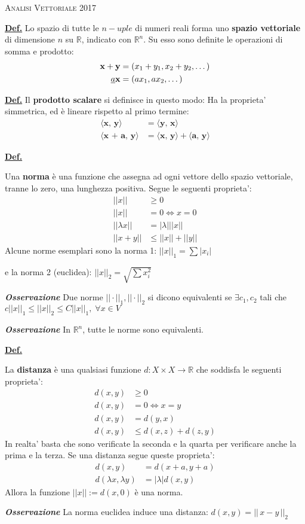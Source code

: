 \documentclass[a4paper,10pt]{article} %
\newcommand{\msection}[1]{%
    {\newpage\bigbreak \bigbreak \par \hfil \huge \textsc {#1}}\par}
\renewcommand{\b}[1]{%
    {\textbf{#1}}}
\newcommand{\ldef}[1]{%
    {\smallbreak\par\normalsize\textbf{\underline{Def.}} {#1} \smallbreak}}
\newcommand{\loss}[1]{%
    {\smallbreak\par\scriptsize\emph{\textbf{Osservazione}} {#1} \par}}
\begin{document}
\msection{Analisi Vettoriale 2017}

\begin{multicols}{2} 

\ldef{
Lo spazio di tutte le $n-uple$ di numeri reali forma uno \b{spazio vettoriale} di dimensione $n$ su $\mathbb{R}$, indicato con $\mathbb{R}^n$. 
Su esso sono definite le operazioni di somma e prodotto: 
\begin{align}
    \b{x} + \b{y} =&\; (x_1 + y_1, x_2 + y_2, \dots) \\
    \emph{a}\b{x} =&\; (ax_1, ax_2, \dots) 
\end{align}
}

\ldef{Il \b{prodotto scalare} si definisce in questo modo:
Ha la proprieta' simmetrica, ed \`{e} lineare rispetto al primo termine: 
\begin{align}
    \langle \b{x, y} \rangle &= \langle \b{y, x} \rangle \\
    \langle \b{x + a, y} \rangle &= \langle \b{x, y} \rangle + \langle \b{a, y} \rangle 
\end{align}
}


\ldef{ Una \b{norma} \`{e} una funzione che assegna ad ogni vettore dello spazio vettoriale, tranne lo zero, una lunghezza positiva. Segue le seguenti proprieta':
    \begin{align}
    ||x||  &\geq  0 \\
    ||x||  &=  0  \Leftrightarrow x = 0 \\
    ||\lambda x|| &=  |\lambda| ||x|| \\
    ||x + y|| &\leq  ||x|| + ||y|| 
    \end{align}
    Alcune norme esemplari sono la norma 1: $\displaystyle ||x||_1 = \sum |x_i|$ \par
    e la norma 2 (euclidea): $\displaystyle ||x||_2 = \sqrt{\sum x_i^2}$
    \loss{
        Due norme $|| \cdot ||_1,|| \cdot ||_2$  si dicono equivalenti se $ \exists c_1, c_2$ tali che $c||x||_1 \leq ||x||_2 \leq C||x||_1, \; \forall x \in V$
    }
    \loss{
        In $\mathbb{R}^n$, tutte le norme sono equivalenti.
    }
}


\ldef{ La \b{distanza} \`{e} una qualsiasi funzione $d: X \times X \rightarrow \mathbb{R}$ che soddisfa le seguenti proprieta':
    \begin{align}
        d(x,y) &\geq 0 \\
        d(x,y) &= 0 \Leftrightarrow x = y \\
        d(x,y) &= d(y,x) \\
        d(x,y) &\leq d(x,z) + d(z,y) 
    \end{align}
    In realta' basta che sono verificate la seconda e la quarta per verificare anche la prima e la terza. 
    Se una distanza segue queste proprieta':
    \begin{align}
        d(x,y) &= d(x+a, y+a) \\
        d(\lambda x, \lambda y) &= |\lambda| d(x,y) 
    \end{align}
    Allora la funzione $||x|| := d(x, 0)$ \`{e} una norma.
    \loss{
        La norma euclidea induce una distanza: $d(x,y) = || \, x - y \, ||_2$
    }
}



\end{multicols}
\end{document}
